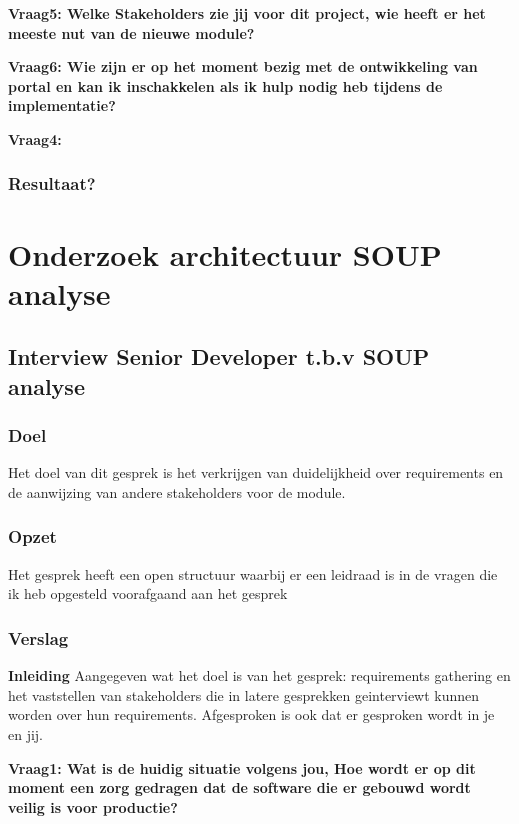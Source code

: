 \textbf{Vraag5: Welke Stakeholders zie jij voor dit project, wie heeft er het meeste nut van de nieuwe module? }

\lipsum[06]
\bigskip

\textbf{Vraag6: Wie zijn er op het moment bezig met de ontwikkeling van portal en kan ik inschakkelen als ik hulp nodig heb tijdens de implementatie?}

\lipsum[09]
\bigskip

\textbf{Vraag4: }

\lipsum[07]

\subsubsection{Resultaat?}

\section{Onderzoek architectuur SOUP analyse}
\subsection{Interview Senior Developer t.b.v SOUP analyse}

\subsubsection{Doel}
Het doel van dit gesprek is het verkrijgen van duidelijkheid over requirements en de aanwijzing van andere stakeholders voor de module.

\subsubsection{Opzet}
Het gesprek heeft een open structuur waarbij er een leidraad is in de vragen die ik heb opgesteld voorafgaand aan het gesprek

\subsubsection{Verslag}
\textbf{Inleiding}
Aangegeven wat het doel is van het gesprek: requirements gathering en het vaststellen van stakeholders die in latere gesprekken geinterviewt kunnen worden over hun requirements. Afgesproken is ook dat er gesproken wordt in je en jij.

\bigskip

\textbf{Vraag1: Wat is de huidig situatie volgens jou, Hoe wordt er op dit moment een zorg gedragen dat de software die er gebouwd wordt veilig is voor productie?}

